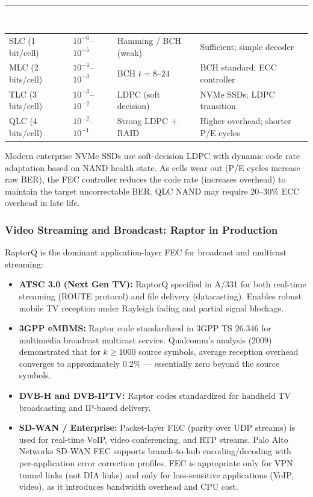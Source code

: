 \documentclass[11pt,letterpaper]{article}
\newcommand{\tableheader}[1]{\textbf{\sffamily\textcolor{white}{#1}}}
\begin{document}
\begin{center}
\begin{tabularx}{\textwidth}{L{2.5cm}C{2.5cm}L{3cm}X}
\toprule
{}
\tableheader{NAND Type} & \tableheader{Raw BER} & \tableheader{FEC Scheme} & \tableheader{Notes} \\
\midrule
SLC (1 bit/cell) & $10^{-6}$--$10^{-5}$ & Hamming / BCH (weak) & Sufficient; simple decoder \\
MLC (2 bits/cell) & $10^{-4}$--$10^{-3}$ & BCH $t=8$--$24$ & BCH standard; ECC controller \\
TLC (3 bits/cell) & $10^{-3}$--$10^{-2}$ & LDPC (soft decision) & NVMe SSDs; LDPC transition \\
QLC (4 bits/cell) & $10^{-2}$--$10^{-1}$ & Strong LDPC + RAID & Higher overhead; shorter P/E cycles \\
\bottomrule
\end{tabularx}
\end{center}

Modern enterprise NVMe SSDs use soft-decision LDPC with dynamic code rate adaptation based on NAND health state. As cells wear out (P/E cycles increase raw BER), the FEC controller reduces the code rate (increases overhead) to maintain the target uncorrectable BER. QLC NAND may require 20--30\% ECC overhead in late life.

\subsubsection{Video Streaming and Broadcast: Raptor in Production}

RaptorQ is the dominant application-layer FEC for broadcast and multicast streaming:
\begin{itemize}[leftmargin=*]
  \item \textbf{ATSC 3.0 (Next Gen TV):} RaptorQ specified in A/331 for both real-time streaming (ROUTE protocol) and file delivery (datacasting). Enables robust mobile TV reception under Rayleigh fading and partial signal blockage.
  \item \textbf{3GPP eMBMS:} Raptor code standardized in 3GPP TS 26.346 for multimedia broadcast multicast service. Qualcomm's analysis (2009) demonstrated that for $k \geq 1000$ source symbols, average reception overhead converges to approximately 0.2\% --- essentially zero beyond the source symbols.
  \item \textbf{DVB-H and DVB-IPTV:} Raptor codes standardized for handheld TV broadcasting and IP-based delivery.
  \item \textbf{SD-WAN / Enterprise:} Packet-layer FEC (parity over UDP streams) is used for real-time VoIP, video conferencing, and RTP streams. Palo Alto Networks SD-WAN FEC supports branch-to-hub encoding/decoding with per-application error correction profiles. FEC is appropriate only for VPN tunnel links (not DIA links) and only for loss-sensitive applications (VoIP, video), as it introduces bandwidth overhead and CPU cost.
\end{itemize}
\end{document}
